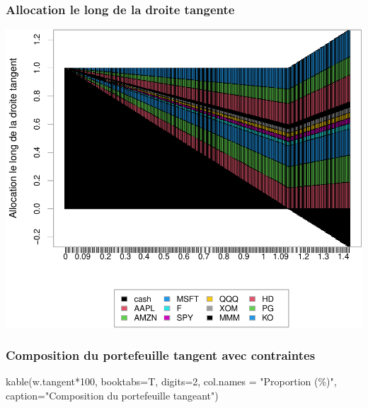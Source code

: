 \documentclass[
]{article}
\newenvironment{Shaded}{\begin{snugshade}}{\end{snugshade}}
\newcommand{\AttributeTok}[1]{\textcolor[rgb]{0.77,0.63,0.00}{#1}}
\newcommand{\DecValTok}[1]{\textcolor[rgb]{0.00,0.00,0.81}{#1}}
\newcommand{\FunctionTok}[1]{\textcolor[rgb]{0.00,0.00,0.00}{#1}}
\newcommand{\NormalTok}[1]{#1}
\newcommand{\SpecialCharTok}[1]{\textcolor[rgb]{0.00,0.00,0.00}{#1}}
\newcommand{\StringTok}[1]{\textcolor[rgb]{0.31,0.60,0.02}{#1}}
\begin{document}
\hypertarget{allocation-le-long-de-la-droite-tangente-2}{%
\subsubsection{Allocation le long de la droite
tangente}\label{allocation-le-long-de-la-droite-tangente-2}}

\includegraphics{TP-2_files/figure-latex/unnamed-chunk-21-1.pdf}

\hypertarget{composition-du-portefeuille-tangent-avec-contraintes-1}{%
\subsubsection{Composition du portefeuille tangent avec
contraintes}\label{composition-du-portefeuille-tangent-avec-contraintes-1}}

\begin{Shaded}
\begin{Highlighting}[]
\FunctionTok{kable}\NormalTok{(w.tangent}\SpecialCharTok{*}\DecValTok{100}\NormalTok{, }\AttributeTok{booktabs=}\NormalTok{T, }\AttributeTok{digits=}\DecValTok{2}\NormalTok{, }\AttributeTok{col.names =} \StringTok{"Proportion (\%)"}\NormalTok{,}
      \AttributeTok{caption=}\StringTok{"Composition du portefeuille tangeant"}\NormalTok{)}
\end{Highlighting}
\end{Shaded}
\end{document}
